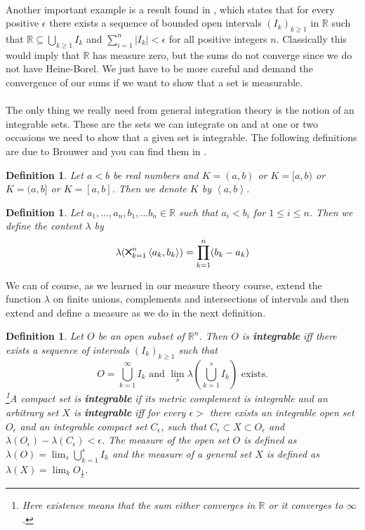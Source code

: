 \documentclass[11pt,a4paper,leqno]{report}
\newcommand{\Cross}{\mathbin{\tikz [x=1.4ex,y=1.4ex,line width=.2ex] \draw (0,0) -- (1,1) (0,1) -- (1,0);}}%
\newtheorem{definition}[theorem]{Definition}
\numberwithin{equation}{chapter}
\begin{document}
\\
Another important example is a result found in \cite[Theorem 4.1 p. 60]{VAR}, which states that for every positive $\epsilon$ there exists a sequence of bounded open intervals $(I_k)_{k\geq 1}$ in $\mathbb{R}$ such that $\mathbb{R}\subseteq\bigcup_{k\geq 1}I_k$ and $\sum_{i=1}^n |I_k|<\epsilon$ for all positive integers $n$. Classically this would imply that $\mathbb{R}$ has measure zero, but the sums do not converge since we do not have Heine-Borel. We just have to be more careful and demand the convergence of our sums if we want to show that a set is measurable.
\\
\\
The only thing we really need from general integration theory is the notion of an integrable sets. These are the sets we can integrate on and at one or two occasions we need to show that a given set is integrable. The following definitions are due to Brouwer and you can find them in \cite{CIF}.
\begin{definition} Let $a<b$ be real numbers and $K=(a,b)$ or $K=[a,b)$ or $K=(a,b]$ or $K=[a,b]$. Then we denote $K$ by $\left\langle a,b\right\rangle$.\end{definition}
\begin{definition} Let $a_1,...,a_n,b_1,... b_n\in\mathbb{R}$ such that $a_i< b_i$ for $1\leq i\leq n$. Then we define the content $\lambda$ by
\begin{equation}\lambda(\Cross_{k=1}^n\left\langle a_k,b_k\right\rangle)=\prod_{k=1}^n(b_k-a_k)\end{equation}
\end{definition}
We can of course, as we learned in our measure theory course, extend the function $\lambda$ on finite unions, complements and intersections of intervals and then extend and define a measure as we do in the next definition.
\begin{definition} Let $O$ be an open subset of $\mathbb{R}^n$. Then $O$ is \textbf{integrable} iff there exists a sequence of intervals $(I_k)_{k\geq 1}$ such that 
\begin{equation} O=\bigcup_{k=1}^\infty I_k\text{		and 	}\lim_{s}\lambda(\bigcup_{k=1}^s I_k)\text{ exists.}\end{equation}
\footnote{Here existence means that the sum either converges in $\mathbb{R}$ or it converges to $\infty$.}A compact set is \textbf{integrable} if its metric complement is integrable and an arbitrary set $X$ is \textbf{integrable} iff for every $\epsilon>$ there exists an integrable open set $O_\epsilon$ and an integrable compact set $C_\epsilon$, such that $C_\epsilon\subset X\subset O_\epsilon$ and $\lambda(O_\epsilon)-\lambda(C_\epsilon) <\epsilon$.
The measure of the open set $O$ is defined as $\lambda(O)=\lim_{s}\bigcup_{k=1}^s I_k$ and the measure of a general set $X$ is defined as $\lambda(X)=\lim_{k}O_\frac{1}{k}$. 
\end{definition}
\end{document}
